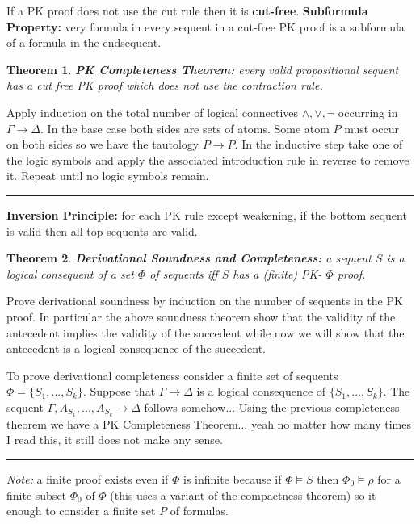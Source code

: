 \documentclass[twoside]{article}
\newcounter{lecnum}
\newtheorem{theorem}{Theorem}[lecnum]
\newenvironment{proof}{{\bf Proof:}}{\hfill\rule{2mm}{2mm}}
\begin{document}
If a PK proof does not use the cut rule then it is \textbf{cut-free}. \textbf{Subformula Property:} very formula in every sequent in a cut-free PK proof is a subformula of a formula in the endsequent. 

\begin{theorem}
\textbf{PK Completeness Theorem:} every valid propositional sequent has a cut free PK proof which does not use the contraction rule.
\end{theorem}
\begin{proof}
Apply induction on the total number of logical connectives $\land, \lor, \lnot$ occurring in $\Gamma \rightarrow \Delta$. In the base case both sides are sets of atoms. Some atom $P$ must occur on both sides so we have the tautology $P \rightarrow P$. In the inductive step take one of the logic symbols and apply the associated introduction rule in reverse to remove it. Repeat until no logic symbols remain. 
\end{proof}

\textbf{Inversion Principle:} for each PK rule except weakening, if the bottom sequent is valid then all top sequents are valid. 

\begin{theorem}
\textbf{Derivational Soundness and Completeness:} a sequent $S$ is a logical consequent of a set $\Phi$ of sequents iff $S$ has a (finite) PK- $\Phi$ proof. 
\end{theorem}
\begin{proof}
Prove derivational soundness by induction on the number of sequents in the PK proof. In particular the above soundness theorem show that the validity of the antecedent implies the validity of the succedent while now we will show that the antecedent is a logical consequence of the succedent. 

To prove derivational completeness consider a finite set of sequents $\Phi = \{S_1, ..., S_k\}$. Suppose that $\Gamma \rightarrow \Delta$ is a logical consequence of $\{S_1, ..., S_k\}$. The sequent $\Gamma, A_{S_1}, ..., A_{S_k} \rightarrow \Delta$ follows somehow... Using the previous completeness theorem we have a PK Completeness Theorem... yeah no matter how many times I read this, it still does not make any sense.   
\end{proof}

\textit{Note:} a finite proof exists even if $\Phi$ is infinite because if $\Phi \vDash S$ then $\Phi_0 \vDash \rho$ for a finite subset $\Phi_0$ of $\Phi$ (this uses a variant of the compactness theorem) so it enough to consider a finite set $P$ of formulas.
\end{document}
